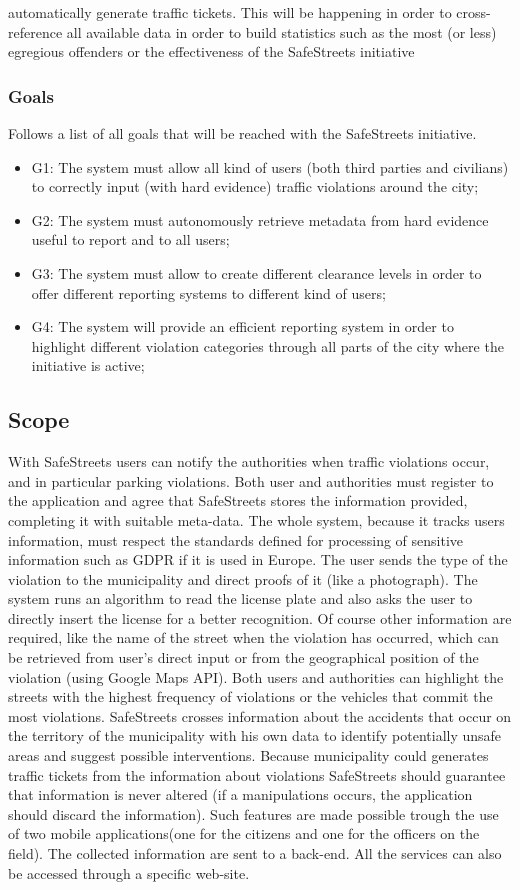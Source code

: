 \documentclass{article}
\begin{document}
    automatically generate traffic tickets. This will be happening in order to
    cross-reference all available data in order to build statistics such as the
    most (or less) egregious offenders or the effectiveness of the SafeStreets
    initiative \subsubsection{Goals} Follows a list of all goals that will be
    reached with the SafeStreets initiative.
    \begin{itemize}
        \item G1: The system must allow all kind of users (both third parties
        and civilians) to correctly input (with hard evidence) traffic
        violations around the city;
        \item G2: The system must autonomously retrieve metadata from hard
        evidence useful to report and to all users;
        \item G3: The system must allow to create different clearance levels in
        order to offer different reporting systems to different kind of users;
        \item G4: The system will provide an efficient reporting system in order
        to highlight different violation categories through all parts of the
        city where the initiative is active;
    \end{itemize}
\subsection{Scope}
With SafeStreets users can notify the authorities when traffic violations occur,
and in particular parking violations. Both user and authorities must register to
the application and agree that SafeStreets stores the information provided,
completing it with suitable meta-data. The whole system, because it tracks users
information, must respect the standards defined for processing of sensitive
information such as GDPR if it is used in Europe. The user sends the type of the
violation to the municipality and direct proofs of it (like a photograph). The
system runs an algorithm to read the license plate and also asks the user to
directly insert the license for a better recognition. Of course other
information are required, like the name of the street when the violation has
occurred, which can be retrieved from user's direct input or from the
geographical position of the violation (using Google Maps API). Both users and
authorities can highlight the streets with the highest frequency of violations
or the vehicles that commit the most violations. SafeStreets crosses information
about the accidents that occur on the territory of the municipality with his own
data to identify potentially unsafe areas and suggest possible interventions.
Because municipality could generates traffic tickets from the information about
violations SafeStreets should guarantee that information is never altered (if a
manipulations occurs, the application should discard the information). Such
features are made possible trough the use of two mobile applications(one for the
citizens and one for the officers on the field). The collected information are
sent to a back-end. All the services can also be accessed through a specific
web-site. 
\end{document}
